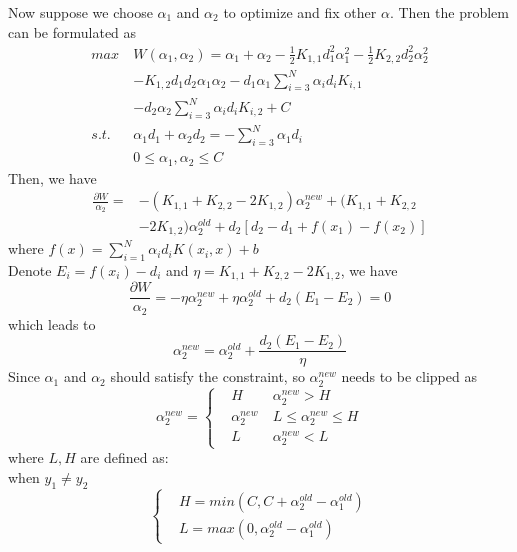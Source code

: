 \documentclass[twocolumn, a4paper]{article}
\begin{document}
Now suppose we choose $\alpha_1$ and $\alpha_2$ to optimize and fix other $\alpha$. Then the problem can be formulated as
\begin{equation}
\begin{aligned}
\nonumber
  max\ &W(\alpha_1,\alpha_2) = \alpha_1 + \alpha_2 - \frac{1}{2}K_{1,1}d_1^2\alpha_1^2-\frac{1}{2}K_{2,2}d_2^2\alpha_2^2\\&-K_{1,2}d_1d_2\alpha_1\alpha_2-d_1\alpha_1\sum_{i=3}^N\alpha_id_iK_{i,1}\\&-d_2\alpha_2\sum_{i=3}^N\alpha_id_iK_{i,2}+C \\
  s.t.\ \ &\alpha_1d_1+\alpha_2d_2=-\sum_{i=3}^N\alpha_1d_i\\
  &0\le \alpha_1, \alpha_2\le C
\end{aligned}
\end{equation}
Then, we have
\begin{equation}
\begin{aligned}
\nonumber
  \frac{\partial W}{\alpha_2} = &-(K_{1,1}+K_{2,2}-2K_{1,2})\alpha_2^{new}+(K_{1,1}+K_{2,2}\\&-2K_{1,2})\alpha_2^{old}+d_2[d_2-d_1+f(x_1)-f(x_2)]
\end{aligned}
\end{equation}
where $f(x)=\sum_{i=1}^N\alpha_id_iK(x_i,x)+b$\\
Denote $E_i=f(x_i)-d_i$ and $\eta = K_{1,1}+K_{2,2}-2K_{1,2}$, we have
\begin{equation}
\nonumber
  \frac{\partial W}{\alpha_2} = -\eta \alpha_2^{new}+\eta \alpha_2^{old}+d_2(E_1-E_2)=0
\end{equation}
which leads to 
\begin{equation}
\nonumber
  \alpha_2^{new}=\alpha_2^{old}+\frac{d_2(E_1-E_2)}{\eta}
\end{equation}
Since $\alpha_1$ and $\alpha_2$ should satisfy the constraint, so $\alpha_2^{new}$ needs to be clipped as
\begin{equation}
\alpha_2^{new}=\left\{
\begin{aligned}
\nonumber
&H\ &\alpha_2^{new}>H\\
&\alpha_2^{new}\ &L\le \alpha_2^{new} \le H\\
&L\ &\alpha_2^{new}<L
\end{aligned}
\right.
\end{equation}
where $L,H$ are defined as:\\
when $y_1 \ne y_2$
\begin{equation}
\left\{
\begin{aligned}
\nonumber
&H = min(C,C+\alpha_2^{old}-\alpha_1^{old})\\
&L = max(0,\alpha_2^{old}-\alpha_1^{old})
\end{aligned}
\right.
\end{equation}
\end{document}

